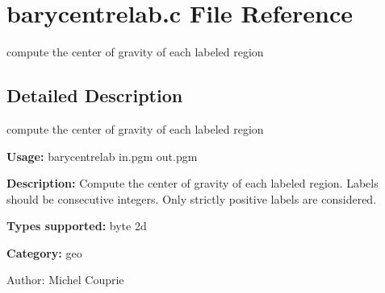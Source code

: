 \section{barycentrelab.c File Reference}
\label{barycentrelab_8c}
compute the center of gravity of each labeled region 



\subsection{Detailed Description}
compute the center of gravity of each labeled region 

{\bf Usage:} barycentrelab in.pgm out.pgm

{\bf Description:} Compute the center of gravity of each labeled region. Labels should be consecutive integers. Only strictly positive labels are considered.

{\bf Types supported:} byte 2d

{\bf Category:} geo

\begin{Desc}
\item[Author:]Michel Couprie \end{Desc}
